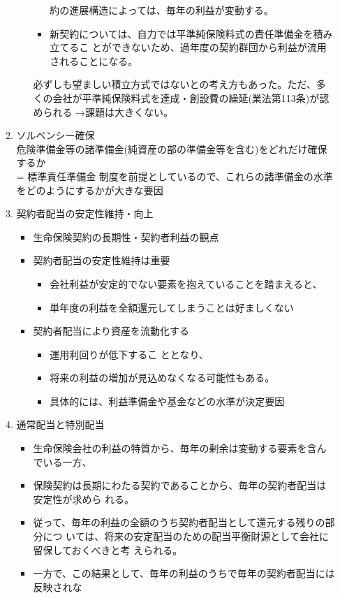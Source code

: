 \documentclass[report,gutter=10mm,fore-edge=10mm,uplatex,dvipdfmx]{jlreq}
\begin{document}
\begin{enumerate}
\begin{enumerate}
\begin{enumerate}
\begin{itemize}
約の進展構造によっては、毎年の利益が変動する。
 \item 新契約については、自力では平準純保険料式の責任準備金を積み立てるこ
とができないため、過年度の契約群団から利益が流用されることになる。
\end{itemize}
必ずしも望ましい積立方式ではないとの考え方もあった。ただ、多くの会社が平準純保険料式を達成・創設費の繰延(業法第113条)が認められる →課題は大きくない。
\end{enumerate}
 \item ソルベンシー確保\\
危険準備金等の諸準備金(純資産の部の準備金等を含む)をどれだけ確保するか \\
= 標準責任準備金
制度を前提としているので、これらの諸準備金の水準をどのようにするかが大きな要因
 \item 契約者配当の安定性維持・向上
\begin{itemize}
 \item 生命保険契約の長期性・契約者利益の観点
 \item 契約者配当の安定性維持は重要
\begin{itemize}
 \item 会社利益が安定的でない要素を抱えていることを踏まえると、
 \item 単年度の利益を全額還元してしまうことは好ましくない
\end{itemize}
 \item 契約者配当により資産を流動化する
\begin{itemize}
 \item 運用利回りが低下するこ
ととなり、
 \item 将来の利益の増加が見込めなくなる可能性もある。
 \item 具体的には、利益準備金や基金などの水準が決定要因
\end{itemize}
\end{itemize}
 \item 通常配当と特別配当
\begin{itemize}
 \item 生命保険会社の利益の特質から、毎年の剰余は変動する要素を含んでいる一方、
 \item 保険契約は長期にわたる契約であることから、毎年の契約者配当は安定性が求めら
れる。
 \item 従って、毎年の利益の全額のうち契約者配当として還元する残りの部分につ
いては、将来の安定配当のための配当平衡財源として会社に留保しておくべきと考
えられる。
 \item 一方で、この結果として、毎年の利益のうちで毎年の契約者配当には反映されな

\end{itemize}
\end{enumerate}
\end{enumerate}
\end{document}
